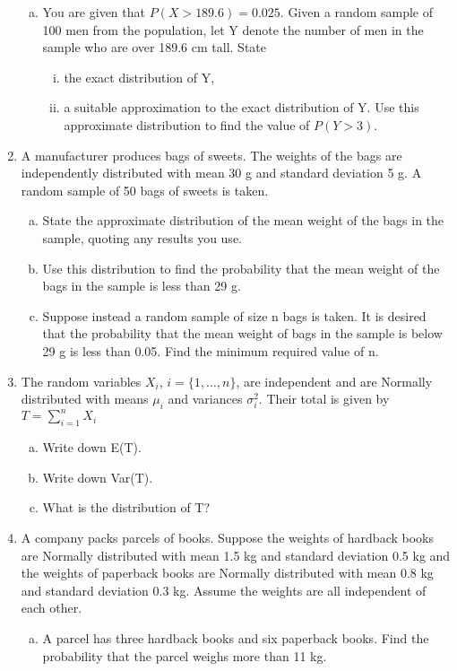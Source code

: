 \documentclass[a4paper,12pt]{article}
\begin{document}
\begin{enumerate}
\begin{enumerate}[(a)]
\item You are given that $P(X > 189.6) = 0.025$. Given a random sample of 100 men from the population, let Y denote the number of men in the sample who are over 189.6 cm tall. State 
\begin{enumerate}[(i)]
\item the exact distribution of Y, 
\item a suitable approximation to the exact distribution of Y. Use this approximate distribution to find the value of $P(Y > 3)$. 
\end{enumerate}


 

\end{enumerate}

\item A manufacturer produces bags of sweets. The weights of the bags are
independently distributed with mean 30 g and standard deviation 5 g. A
random sample of 50 bags of sweets is taken.
\begin{enumerate}[(a)]
\item State the approximate distribution of the mean weight of the bags in the
sample, quoting any results you use.
\item Use this distribution to find the probability that the mean weight of the
bags in the sample is less than 29 g.
\item  Suppose instead a random sample of size n bags is taken. It is desired
that the probability that the mean weight of bags in the sample is below
29 g is less than 0.05. Find the minimum required value of n.
\end{enumerate}

\item The random variables $X_i$, $i = \{1,\ldots, n\}$, are independent and are Normally distributed
with means $\mu_i$ and variances $\sigma^2_i$. 
Their total is given by
$T = \sum^{n}_{i=1}X_i$

\begin{enumerate}[(a)]
\item  Write down E(T).
\item  Write down Var(T).
\item  What is the distribution of T?
\end{enumerate}

\item  A company packs parcels of books. Suppose the weights of hardback books
are Normally distributed with mean 1.5 kg and standard deviation 0.5 kg and
the weights of paperback books are Normally distributed with mean 0.8 kg and
standard deviation 0.3 kg. Assume the weights are all independent of each
other.
\begin{enumerate}[(a)]
\item  A parcel has three hardback books and six paperback books. Find the
probability that the parcel weighs more than 11 kg.


\end{enumerate}
\end{enumerate}
\end{document}
